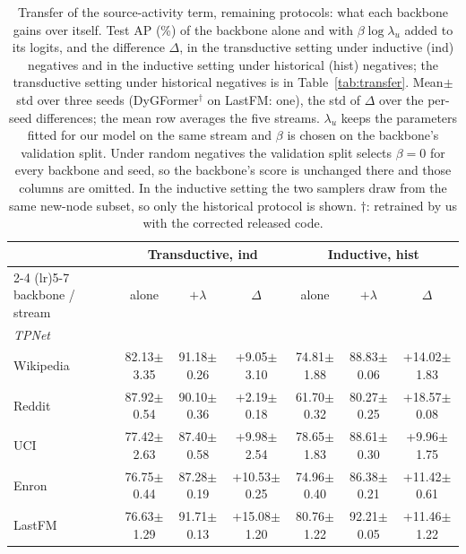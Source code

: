 \begin{table}[t]
\caption{Transfer of the source-activity term, remaining protocols: what each backbone gains over itself. Test AP (\%) of the backbone alone and with $\beta\log\lambda_u$ added to its logits, and the difference $\Delta$, in the transductive setting under inductive (ind) negatives and in the inductive setting under historical (hist) negatives; the transductive setting under historical negatives is in Table~\ref{tab:transfer}. Mean{\scriptsize$\pm$std} over three seeds (DyGFormer$^\dagger$ on LastFM: one), the std of $\Delta$ over the per-seed differences; the mean row averages the five streams. $\lambda_u$ keeps the parameters fitted for our model on the same stream and $\beta$ is chosen on the backbone's validation split. Under random negatives the validation split selects $\beta=0$ for every backbone and seed, so the backbone's score is unchanged there and those columns are omitted. In the inductive setting the two samplers draw from the same new-node subset, so only the historical protocol is shown. $\dagger$: retrained by us with the corrected released code.}
\label{tab:transfer_appendix}
\centering
\scriptsize
\setlength{\tabcolsep}{4pt}
\renewcommand{\arraystretch}{0.95}
\begin{tabular}{lcccccc}
\toprule
 & \multicolumn{3}{c}{Transductive, ind} & \multicolumn{3}{c}{Inductive, hist} \\
\cmidrule(lr){2-4} \cmidrule(lr){5-7}
backbone / stream & alone & $+\lambda$ & $\Delta$ & alone & $+\lambda$ & $\Delta$ \\
\midrule
\multicolumn{7}{l}{\textit{TPNet}} \\
Wikipedia & 82.13{\tiny$\pm$3.35} & 91.18{\tiny$\pm$0.26} & +9.05{\tiny$\pm$3.10} & 74.81{\tiny$\pm$1.88} & 88.83{\tiny$\pm$0.06} & +14.02{\tiny$\pm$1.83} \\
Reddit & 87.92{\tiny$\pm$0.54} & 90.10{\tiny$\pm$0.36} & +2.19{\tiny$\pm$0.18} & 61.70{\tiny$\pm$0.32} & 80.27{\tiny$\pm$0.25} & +18.57{\tiny$\pm$0.08} \\
UCI & 77.42{\tiny$\pm$2.63} & 87.40{\tiny$\pm$0.58} & +9.98{\tiny$\pm$2.54} & 78.65{\tiny$\pm$1.83} & 88.61{\tiny$\pm$0.30} & +9.96{\tiny$\pm$1.75} \\
Enron & 76.75{\tiny$\pm$0.44} & 87.28{\tiny$\pm$0.19} & +10.53{\tiny$\pm$0.25} & 74.96{\tiny$\pm$0.40} & 86.38{\tiny$\pm$0.21} & +11.42{\tiny$\pm$0.61} \\
LastFM & 76.63{\tiny$\pm$1.29} & 91.71{\tiny$\pm$0.13} & +15.08{\tiny$\pm$1.20} & 80.76{\tiny$\pm$1.22} & 92.21{\tiny$\pm$0.05} & +11.46{\tiny$\pm$1.22} \\

\end{tabular}
\end{table}
